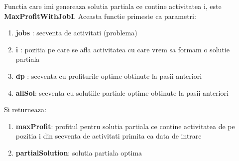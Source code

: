 Functia care imi genereaza solutia partiala ce contine activitatea i, este \textbf{MaxProfitWithJobI}. Aceasta functie primeste ca parametri: 
\begin{enumerate}
    \item \textbf{jobs} : secventa de activitati (problema)
    \item \textbf{i} : pozitia pe care se afla activitatea cu care vrem sa formam o solutie partiala 
    \item \textbf{dp} : secventa cu profiturile optime obtinute la pasii anteriori
    \item \textbf{allSol}: secventa cu solutiile partiale optime obtinute la pasii anteriori
\end{enumerate}
Si returneaza:
\begin{enumerate}
    \item \textbf{maxProfit}: profitul pentru solutia partiala ce contine activitatea de pe pozitia i din secventa de activitati primita ca data de intrare
    \item \textbf{partialSolution}: solutia partiala optima 
\end{enumerate}

